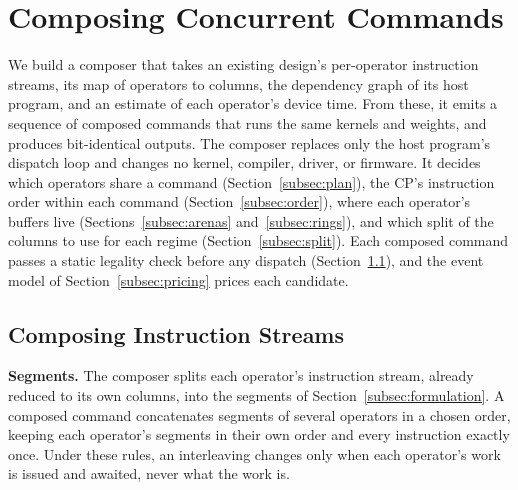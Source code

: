 \section{Composing Concurrent Commands}
\label{sec:method}

We build a composer that takes an existing design's per-operator instruction streams, its map of operators to columns, the dependency graph of its host program, and an estimate of each operator's device time.
From these, it emits a sequence of composed commands that runs the same kernels and weights, and produces bit-identical outputs.
The composer replaces only the host program's dispatch loop and changes no kernel, compiler, driver, or firmware.
It decides which operators share a command (Section~\ref{subsec:plan}), the CP's instruction order within each command (Section~\ref{subsec:order}), where each operator's buffers live (Sections~\ref{subsec:arenas} and~\ref{subsec:rings}), and which split of the columns to use for each regime (Section~\ref{subsec:split}).
Each composed command passes a static legality check before any dispatch (Section~\ref{subsec:compose}), and the event model of Section~\ref{subsec:pricing} prices each candidate.

\subsection{Composing Instruction Streams}
\label{subsec:compose}

\textbf{Segments.}
The composer splits each operator's instruction stream, already reduced to its own columns, into the segments of Section~\ref{subsec:formulation}.
A composed command concatenates segments of several operators in a chosen order, keeping each operator's segments in their own order and every instruction exactly once.
Under these rules, an interleaving changes only when each operator's work is issued and awaited, never what the work is.

